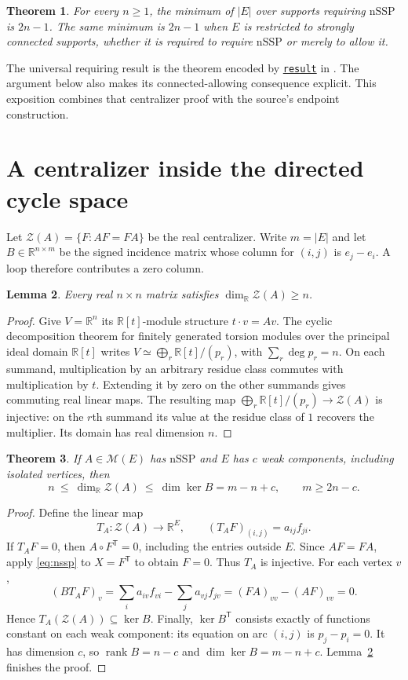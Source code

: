 \documentclass[11pt]{article}
\newtheorem{theorem}{Theorem}
\newtheorem{lemma}[theorem]{Lemma}
\newcommand{\R}{\mathbb R}
\newcommand{\Zc}{\mathcal Z}
\newcommand{\nssp}{\mathrm{nSSP}}
\newcommand{\leanlink}[1]{\href{https://github.com/the-omega-institute/trureturing/blob/cc684e6326490f9173bfefcadb0294ee6ccbb0b5/D5/S3/Combinatorics/SpectralGraph/KoljancicOblakMinimumArcs.lean}{\texttt{#1}}}
\begin{document}
\begin{theorem}\label{thm:main}
For every $n\geq1$, the minimum of $|E|$ over supports requiring
$\nssp$ is $2n-1$. The same minimum is $2n-1$ when $E$ is restricted
to strongly connected supports, whether it is required to require
$\nssp$ or merely to allow it.
\end{theorem}

The universal requiring result is the theorem encoded by
\leanlink{result} in \cite{Formal}. The argument below also makes its
connected-allowing consequence explicit. This exposition combines that
centralizer proof with the source's endpoint construction.

\section{A centralizer inside the directed cycle space}
Let $\Zc(A)=\{F:AF=FA\}$ be the real centralizer. Write $m=|E|$ and
let $B\in\R^{n\times m}$ be the signed incidence matrix whose column
for $(i,j)$ is $e_j-e_i$. A loop therefore contributes a zero column.

\begin{lemma}\label{lem:centralizer}
Every real $n\times n$ matrix satisfies $\dim_\R\Zc(A)\geq n$.
\end{lemma}
\begin{proof}
Give $V=\R^n$ its $\R[t]$-module structure $t\cdot v=Av$.
The cyclic decomposition theorem for finitely generated torsion modules
over the principal ideal domain $\R[t]$ writes
$V\simeq\bigoplus_r\R[t]/(p_r)$, with $\sum_r\deg p_r=n$.
On each summand, multiplication by an arbitrary residue class commutes
with multiplication by $t$. Extending it by zero on the other summands
gives commuting real linear maps. The resulting map
$\bigoplus_r\R[t]/(p_r)\longrightarrow\Zc(A)$ is injective:
on the $r$th summand its value at the residue class of $1$ recovers the
multiplier. Its domain has real dimension $n$.
\end{proof}

\begin{theorem}\label{thm:cycle}
If $A\in\mathcal M(E)$ has $\nssp$ and $E$ has $c$ weak components,
including isolated vertices, then
\begin{equation}\label{eq:bound}
 n\ \leq\ \dim_\R\Zc(A)\ \leq\ \dim\ker B
   =m-n+c,\qquad m\geq2n-c.
\end{equation}
\end{theorem}
\begin{proof}
Define the linear map
\[
 T_A:\Zc(A)\longrightarrow\R^E,\qquad
       (T_AF)_{(i,j)}=a_{ij}f_{ji}.
\]
If $T_AF=0$, then $A\circ F^{\mathsf T}=0$, including the entries
outside $E$. Since $AF=FA$, apply \eqref{eq:nssp} to $X=F^{\mathsf T}$
to obtain $F=0$. Thus $T_A$ is injective.
For each vertex $v$,
\[
 (BT_AF)_v=\sum_i a_{iv}f_{vi}-\sum_j a_{vj}f_{jv}
         =(FA)_{vv}-(AF)_{vv}=0.
\]
Hence $T_A(\Zc(A))\subseteq\ker B$. Finally,
$\ker B^{\mathsf T}$ consists exactly of functions constant on each
weak component: its equation on arc $(i,j)$ is $p_j-p_i=0$.
It has dimension $c$, so $\operatorname{rank}B=n-c$ and
$\dim\ker B=m-n+c$. Lemma~\ref{lem:centralizer} finishes the proof.
\end{proof}
\end{document}
